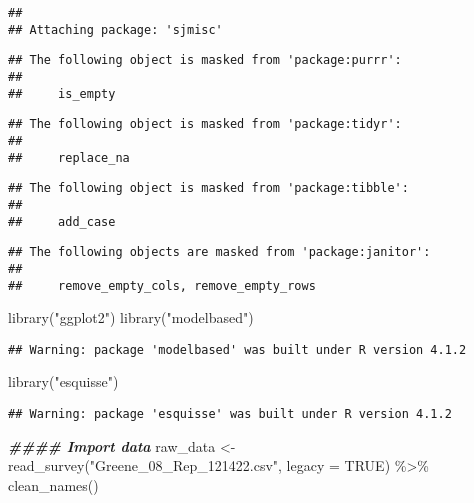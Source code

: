 \documentclass[
]{article}
\newenvironment{Shaded}{\begin{snugshade}}{\end{snugshade}}
\newcommand{\AttributeTok}[1]{\textcolor[rgb]{0.77,0.63,0.00}{#1}}
\newcommand{\ConstantTok}[1]{\textcolor[rgb]{0.00,0.00,0.00}{#1}}
\newcommand{\DocumentationTok}[1]{\textcolor[rgb]{0.56,0.35,0.01}{\textbf{\textit{#1}}}}
\newcommand{\FunctionTok}[1]{\textcolor[rgb]{0.00,0.00,0.00}{#1}}
\newcommand{\NormalTok}[1]{#1}
\newcommand{\OtherTok}[1]{\textcolor[rgb]{0.56,0.35,0.01}{#1}}
\newcommand{\SpecialCharTok}[1]{\textcolor[rgb]{0.00,0.00,0.00}{#1}}
\newcommand{\StringTok}[1]{\textcolor[rgb]{0.31,0.60,0.02}{#1}}
\begin{document}
\begin{verbatim}
## 
## Attaching package: 'sjmisc'
\end{verbatim}

\begin{verbatim}
## The following object is masked from 'package:purrr':
## 
##     is_empty
\end{verbatim}

\begin{verbatim}
## The following object is masked from 'package:tidyr':
## 
##     replace_na
\end{verbatim}

\begin{verbatim}
## The following object is masked from 'package:tibble':
## 
##     add_case
\end{verbatim}

\begin{verbatim}
## The following objects are masked from 'package:janitor':
## 
##     remove_empty_cols, remove_empty_rows
\end{verbatim}

\begin{Shaded}
\begin{Highlighting}[]
\FunctionTok{library}\NormalTok{(}\StringTok{"ggplot2"}\NormalTok{)}
\FunctionTok{library}\NormalTok{(}\StringTok{"modelbased"}\NormalTok{)}
\end{Highlighting}
\end{Shaded}

\begin{verbatim}
## Warning: package 'modelbased' was built under R version 4.1.2
\end{verbatim}

\begin{Shaded}
\begin{Highlighting}[]
\FunctionTok{library}\NormalTok{(}\StringTok{"esquisse"}\NormalTok{)}
\end{Highlighting}
\end{Shaded}

\begin{verbatim}
## Warning: package 'esquisse' was built under R version 4.1.2
\end{verbatim}

\begin{Shaded}
\begin{Highlighting}[]
\DocumentationTok{\#\#\#\# Import data}
\NormalTok{raw\_data }\OtherTok{\textless{}{-}} \FunctionTok{read\_survey}\NormalTok{(}\StringTok{"Greene\_08\_Rep\_121422.csv"}\NormalTok{, }\AttributeTok{legacy =} \ConstantTok{TRUE}\NormalTok{) }\SpecialCharTok{\%\textgreater{}\%}
  \FunctionTok{clean\_names}\NormalTok{()}
\end{Highlighting}
\end{Shaded}
\end{document}
